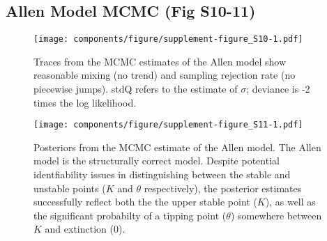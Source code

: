 \documentclass[]{components/elsarticle}
\begin{document}
\newpage 
\newpage 

\subsection{Allen Model MCMC (Fig
S10-11)}\label{allen-model-mcmc-fig-s10-11}

\begin{figure}[htbp]
\centering
\texttt{[image: components/figure/supplement-figure\_S10-1.pdf]}
\caption{Traces from the MCMC estimates of the Allen model show
reasonable mixing (no trend) and sampling rejection rate (no piecewise
jumps). stdQ refers to the estimate of $\sigma$; deviance is -2 times
the log likelihood.}
\end{figure}

\begin{figure}[htbp]
\centering
\texttt{[image: components/figure/supplement-figure\_S11-1.pdf]}
\caption{Posteriors from the MCMC estimate of the Allen model. The Allen
model is the structurally correct model. Despite potential
identfiability issues in distinguishing between the stable and unstable
points ($K$ and $\theta$ respectively), the posterior estimates
successfully reflect both the the upper stable point ($K$), as well as
the significant probabilty of a tipping point ($\theta$) somewhere
between $K$ and extinction (0).}
\end{figure}
\end{document}
